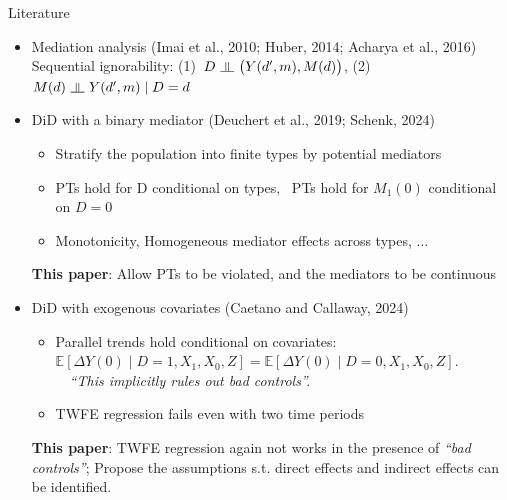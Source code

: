\documentclass[aspectratio=1610, 9pt]{beamer}
\newcommand{\indep}{\rotatebox[origin=c]{90}{$\models$}}
\begin{document}
\begin{frame}{Literature}

\begin{itemize}
  \item Mediation analysis (Imai et al., 2010; Huber, 2014; Acharya et al., 2016)\\ Sequential ignorability: (1)\ $D \ \indep\ \big( Y(d^\prime , m), M(d) \big) $,  \hspace{0.1cm} (2)  $ M(d) \ \indep\ Y(d^\prime,m) \mid D=d$
   
        \vspace{0.3cm}

    \item DiD with a binary mediator (Deuchert et al., 2019; Schenk, 2024)
        \begin{itemize}
         \item[-] Stratify the population into finite types by potential mediators
         \item[-] PTs hold for D conditional on types, \ PTs hold for $M_1(0)$ conditional on $D=0$
            \item[-] Monotonicity, Homogeneous mediator effects across types, ...
        \end{itemize} 
        \vspace{0.1cm}

        \textbf{This paper}: Allow PTs to be violated, and the mediators to be continuous
        \vspace{0.3cm}
    \item DiD with exogenous covariates (Caetano and Callaway, 2024)
    \begin{itemize}
        \item[-] Parallel trends hold  conditional on covariates: $\mathbb{E} [\Delta Y(0)\mid D=1, X_1,X_0,Z]=\mathbb{E} [\Delta Y(0)\mid D=0, X_1,X_0,Z].$  
        \\ \vspace{0.1cm}
        \ \ \textit{``This implicitly rules out bad controls''.}
    
        \end{itemize}
        
        \begin{itemize}
          
        \item[-] TWFE regression fails even with two time periods
    \end{itemize}
        \vspace{0.1cm}

    \textbf{This paper}: TWFE regression again not works in the presence of \textit{``bad controls''}; Propose the assumptions s.t. direct effects and indirect effects can be identified.
\end{itemize}
    
\end{frame}
\end{document}
